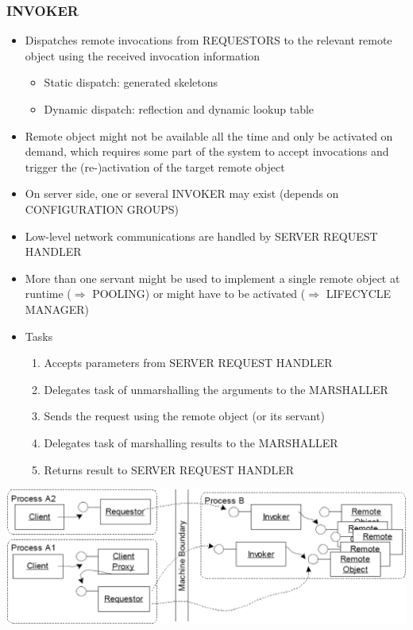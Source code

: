 \documentclass[10pt]{article}
\newcommand{\Ra}{\Rightarrow}
\begin{document}
\subsubsection{INVOKER}
\begin{itemize}
	\item Dispatches remote invocations from REQUESTORS to the relevant remote object using the received invocation information
		\begin{itemize}
			\item Static dispatch: generated skeletons
			\item Dynamic dispatch: reflection and dynamic lookup table
		\end{itemize}
	\item Remote object might not be available all the time and only be activated on demand, which requires some part of the system to accept invocations and trigger the (re-)activation of the target remote object
	\item On server side, one or several INVOKER may exist (depends on CONFIGURATION GROUPS)
	\item Low-level network communications are handled by SERVER REQUEST HANDLER
	\item More than one servant might be used to implement a single remote object at runtime ($\Ra$ POOLING) or might have to be activated ($\Ra$ LIFECYCLE MANAGER)
	\item Tasks
		\begin{enumerate}
			\item Accepts parameters from SERVER REQUEST HANDLER
			\item Delegates task of unmarshalling the arguments to the MARSHALLER
			\item Sends the request using the remote object (or its servant)
			\item Delegates task of marshalling results to the MARSHALLER
			\item Returns result to SERVER REQUEST HANDLER
		\end{enumerate}
\end{itemize}
\begin{center}
	\includegraphics[scale=0.2]{images/invoker.png}
\end{center}
\end{document}
